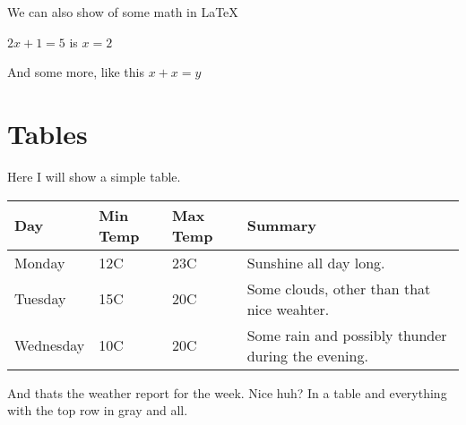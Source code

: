 \documentclass[11pt,a4paper]{article}
\begin{document}
We can also show of some math in \LaTeX\

\(2x+1=5\) is \(x=2\)

And some more, like this \(x+x=y\)


\pagebreak

\section{Tables}
Here I will show a simple table.

\begin{table}[h]
\begin{center}
    \begin{tabular}{ | l | l | l | p{7cm} |}
    \hline
    \cellcolor[gray]{0.9}\textbf{Day} & 
    \cellcolor[gray]{0.9}\textbf{Min Temp} & 
    \cellcolor[gray]{0.9}\textbf{Max Temp} & 
    \cellcolor[gray]{0.9}\textbf{Summary} \\ \hline
    Monday & 12C & 23C & Sunshine all day long.  \\ \hline
    Tuesday & 15C & 20C & Some clouds, other than that nice weahter. \\ \hline
    Wednesday & 10C & 20C & Some rain and possibly thunder during the evening. \\ \hline
    \end{tabular}
\end{center}
\end{table}
And thats the weather report for the week. Nice huh? In a table and everything with the top row in gray and all.
\end{document}
